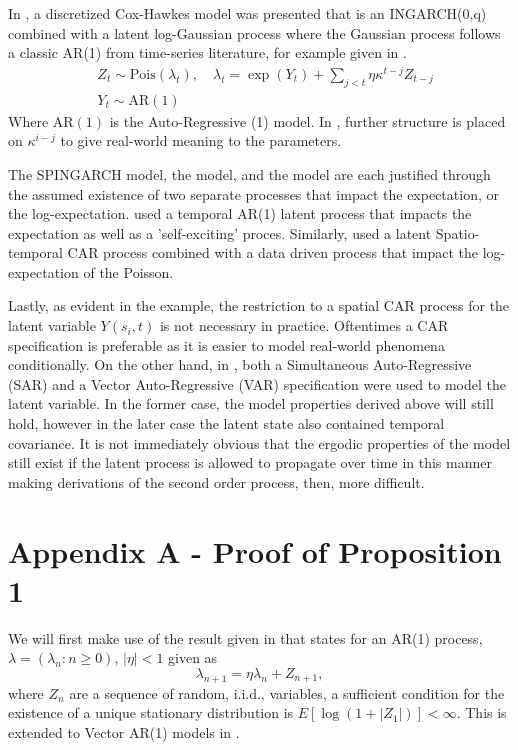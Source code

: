 \documentclass[11pt]{isuthesis}
\begin{document}
In \cite{mohler2013modeling}, a discretized Cox-Hawkes model was presented that is an INGARCH(0,q) combined with a latent log-Gaussian process where the Gaussian process follows a classic AR(1) from time-series literature, for example given in \cite{shumway2010time}. 
\begin{align}
	& Z_t\sim \mbox{Pois}(\lambda_t),\quad \lambda_t=\exp(Y_t)+\sum_{j<t} \eta \kappa^{t-j} Z_{t-j} \\
	& Y_t \sim \mbox{AR}(1)
\end{align}
Where $\mbox{AR}(1)$ is the Auto-Regressive (1) model.  In \cite{mohler2013modeling}, further structure is placed on $\kappa^{i-j}$ to give real-world meaning to the parameters.

The SPINGARCH model, the \cite{martinez2008autoregressive} model, and \cite{mohler2013modeling} the model are each justified through the assumed existence of two separate processes that impact the expectation, or the log-expectation.  \cite{mohler2013modeling} used a temporal AR(1) latent process that impacts the expectation as well as a 'self-exciting' proces.  Similarly, \cite{martinez2008autoregressive} used a latent Spatio-temporal CAR process combined with a data driven process that impact the log-expectation of the Poisson. 

Lastly, as evident in the example, the restriction to a spatial CAR process for the latent variable $Y(s_i,t)$ is not necessary in practice.  Oftentimes a CAR specification is preferable as it is easier to model real-world phenomena conditionally.  On the other hand, in \cite{2017arXiv170308429C}, both a Simultaneous Auto-Regressive (SAR) and a Vector Auto-Regressive (VAR) specification were used to model the latent variable.  In the former case, the model properties derived above will still hold, however in the later case the latent state also contained temporal covariance.  It is not immediately obvious that the ergodic properties of the model still exist if the latent process is allowed to propagate over time in this manner making derivations of the second order process, then, more difficult.

\section*{Appendix A - Proof of Proposition 1}

We will first make use of the result given in \cite{athreya1986mixing} that states for an AR(1) process, $\lambda=(\lambda_n:n\geq 0)$, $|\eta|<1$ given as
\begin{equation}
	\lambda_{n+1}=\eta \lambda_{n}+Z_{n+1},
\end{equation}
where $Z_{n}$ are a sequence of random, i.i.d., variables, a sufficient condition for the existence of a unique stationary distribution is $E[\log(1+|Z_1|)]<\infty$.  This is extended to Vector AR(1) models in \cite{zeevi2004recurrence}.
\end{document}
